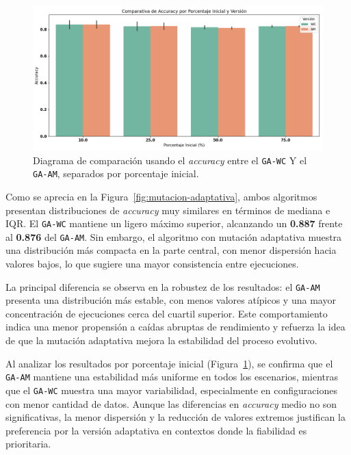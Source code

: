 \begin{figure}[htp]
    \centering
    \includegraphics[width=1\textwidth]{imagenes/evaluaciones/mutacion-adaptativa_por_porcentaje.png}
    \caption{Diagrama de comparación usando el \textit{accuracy} entre el \texttt{GA-WC} Y el \texttt{GA-AM}, separados por porcentaje inicial.}
    \label{fig:mutacion-adaptativa-porcentaje}
\end{figure}

Como se aprecia en la Figura~\ref{fig:mutacion-adaptativa},
ambos algoritmos presentan distribuciones de \textit{accuracy} muy similares en términos de mediana e IQR.
El \texttt{GA-WC} mantiene un ligero máximo superior, alcanzando un \textbf{0.887} frente al \textbf{0.876} del \texttt{GA-AM}.
Sin embargo, el algoritmo con mutación adaptativa muestra una distribución más compacta en la parte central,
con menor dispersión hacia valores bajos, lo que sugiere una mayor consistencia entre ejecuciones.

La principal diferencia se observa en la robustez de los resultados: el \texttt{GA-AM} presenta una distribución más estable,
con menos valores atípicos y una mayor concentración de ejecuciones cerca del cuartil superior.
Este comportamiento indica una menor propensión a caídas abruptas de rendimiento y refuerza la idea de que la mutación
adaptativa mejora la estabilidad del proceso evolutivo.

Al analizar los resultados por porcentaje inicial (Figura~\ref{fig:mutacion-adaptativa-porcentaje}),
se confirma que el \texttt{GA-AM} mantiene una estabilidad más uniforme en todos los escenarios, mientras que el \texttt{GA-WC} muestra una mayor variabilidad,
especialmente en configuraciones con menor cantidad de datos.
Aunque las diferencias en \textit{accuracy} medio no son significativas, la menor dispersión y la reducción de valores extremos justifican la
preferencia por la versión adaptativa en contextos donde la fiabilidad es prioritaria.


